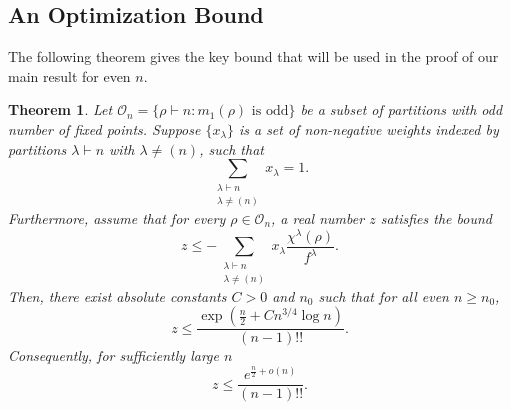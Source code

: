 \documentclass[12pt]{article}
\newtheorem{theorem}{Theorem}
\theoremstyle{definition}
\newcommand{\1}{\mathbf 1}
\begin{document}
\subsection{An Optimization Bound}

The following theorem gives the key bound that will be used in the proof of our main result for even $n$.

\begin{theorem}\label{thm:z_upper_bound}
Let 
$
\mathcal{O}_n = \{ \rho \vdash n : m_1(\rho) \text{ is odd} \} 
$ be a subset of partitions with odd number of fixed points.
Suppose $\{x_\lambda\}$ is a set of non-negative weights indexed by partitions $\lambda \vdash n$ with $\lambda \neq (n)$, such that
$$
\sum_{\substack{\lambda \vdash n \\ \lambda \neq (n)}} x_\lambda = 1.
$$
Furthermore, assume that for every $\rho \in \mathcal{O}_n$, a real number $z$ satisfies the bound
$$
z \le -\sum_{\substack{\lambda \vdash n \\ \lambda \neq (n)}} x_\lambda \frac{\chi^\lambda(\rho)}{f^\lambda}.
$$
Then, there exist absolute constants $C>0$ and $n_0$ such that for all even $n \ge n_0$,
$$
z \le \frac{\exp{\left(\frac{n}{2}+Cn^{3/4}\log n\right)}}{(n-1)!!}.
$$
Consequently, for sufficiently large $n$
$$
z \le \frac{e^{\frac{n}{2}+o(n)}}{(n-1)!!}.
$$
\end{theorem}
\end{document}
